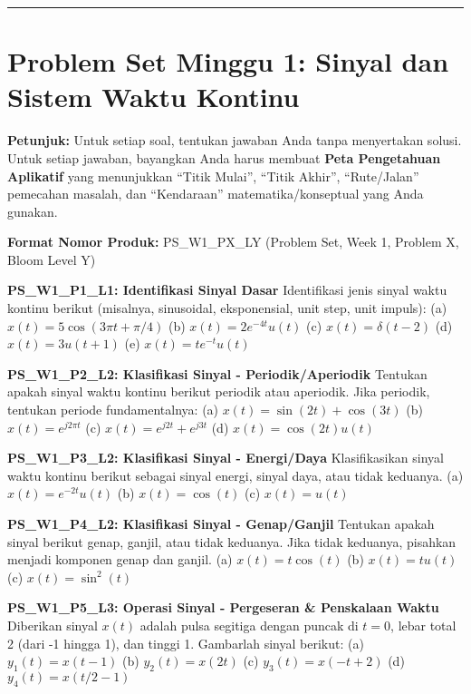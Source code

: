 \documentclass[
  letterpaper,
  DIV=11,
  numbers=noendperiod]{scrreprt}
\begin{document}
\begin{center}\rule{0.5\linewidth}{0.5pt}\end{center}


\chapter{Problem Set Minggu 1: Sinyal dan Sistem Waktu
Kontinu}\label{problem-set-minggu-1-sinyal-dan-sistem-waktu-kontinu-1}

\textbf{Petunjuk:} Untuk setiap soal, tentukan jawaban Anda tanpa
menyertakan solusi. Untuk setiap jawaban, bayangkan Anda harus membuat
\textbf{Peta Pengetahuan Aplikatif} yang menunjukkan ``Titik Mulai'',
``Titik Akhir'', ``Rute/Jalan'' pemecahan masalah, dan ``Kendaraan''
matematika/konseptual yang Anda gunakan.

\textbf{Format Nomor Produk:} PS\_W1\_PX\_LY (Problem Set, Week 1,
Problem X, Bloom Level Y)

\textbf{PS\_W1\_P1\_L1: Identifikasi Sinyal Dasar} Identifikasi jenis
sinyal waktu kontinu berikut (misalnya, sinusoidal, eksponensial, unit
step, unit impuls): (a) \(x(t) = 5 \cos(3\pi t + \pi/4)\) (b)
\(x(t) = 2e^{-4t} u(t)\) (c) \(x(t) = \delta(t-2)\) (d)
\(x(t) = 3u(t+1)\) (e) \(x(t) = t e^{-t} u(t)\)

\textbf{PS\_W1\_P2\_L2: Klasifikasi Sinyal - Periodik/Aperiodik}
Tentukan apakah sinyal waktu kontinu berikut periodik atau aperiodik.
Jika periodik, tentukan periode fundamentalnya: (a)
\(x(t) = \sin(2t) + \cos(3t)\) (b) \(x(t) = e^{j2\pi t}\) (c)
\(x(t) = e^{j2t} + e^{j3t}\) (d) \(x(t) = \cos(2t) u(t)\)

\textbf{PS\_W1\_P3\_L2: Klasifikasi Sinyal - Energi/Daya} Klasifikasikan
sinyal waktu kontinu berikut sebagai sinyal energi, sinyal daya, atau
tidak keduanya. (a) \(x(t) = e^{-2t} u(t)\) (b) \(x(t) = \cos(t)\) (c)
\(x(t) = u(t)\)

\textbf{PS\_W1\_P4\_L2: Klasifikasi Sinyal - Genap/Ganjil} Tentukan
apakah sinyal berikut genap, ganjil, atau tidak keduanya. Jika tidak
keduanya, pisahkan menjadi komponen genap dan ganjil. (a)
\(x(t) = t \cos(t)\) (b) \(x(t) = t u(t)\) (c) \(x(t) = \sin^2(t)\)

\textbf{PS\_W1\_P5\_L3: Operasi Sinyal - Pergeseran \& Penskalaan Waktu}
Diberikan sinyal \(x(t)\) adalah pulsa segitiga dengan puncak di
\(t=0\), lebar total 2 (dari -1 hingga 1), dan tinggi 1. Gambarlah
sinyal berikut: (a) \(y_1(t) = x(t-1)\) (b) \(y_2(t) = x(2t)\) (c)
\(y_3(t) = x(-t+2)\) (d) \(y_4(t) = x(t/2 - 1)\)
\end{document}
